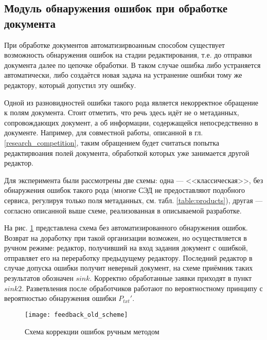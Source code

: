 \subsection{Модуль обнаружения ошибок при обработке документа} \label{research_feedback}

При обработке документов автоматизирвоанным способом существует возможность обнаружения ошибок на стадии редактирования, т.е. до отправки документа далее по цепочке обработки. В таком случае ошибка либо устраняется автоматически, либо создаётся новая задача на устранение ошибки тому же редактору, который допустил эту ошибку.

\vspace{\baselineskip}
Одной из разновидностей ошибки такого рода является некорректное обращение к полям документа. Стоит отметить, что речь здесь идёт не о метаданных, сопровождающих документ, а об информации, содержащейся непосредственно в документе. Например, для совместной работы, описанной в гл. \ref{research_competition}, таким обращением будет считаться попытка редактирвоания полей документа, обработкой которых уже занимается другой редактор.

\vspace{\baselineskip}
Для эксперимента были рассмотрены две схемы: одна --- <<классическая>>, без обнаружения ошибок такого рода (многие СЭД не предоставляют подобного сервиса, регулируя только поля метаданных, см. табл. \ref{table:products}), другая --- согласно описанной выше схеме, реализованная в описываемой разработке.

\vspace{\baselineskip}
На рис. \ref{img:feedback_old_scheme} представлена схема без автоматизированного обнаружения ошибок. Возврат на доработку при такой организации возможен, но осуществляется в ручном режиме: редактор, получивший на вход задания документ с ошибкой, отправляет его на переработку предыдущему редактору. Последний редактор в случае допуска ошибки получит неверный документ, на схеме приёмник таких результатов обозначен $sink$. Корректно обработанные заявки приходят в пункт $sink2$. Разветвления после обработчиков работают по вероятностному принципу с вероятностью обнаружения ошибки $P_{txt}'$.
 
\begin{figure}[h!]
  \centering
  \texttt{[image: feedback\_old\_scheme]}
  \caption{Схема коррекции ошибок ручным методом}
  \label{img:feedback_old_scheme}
\end{figure}

